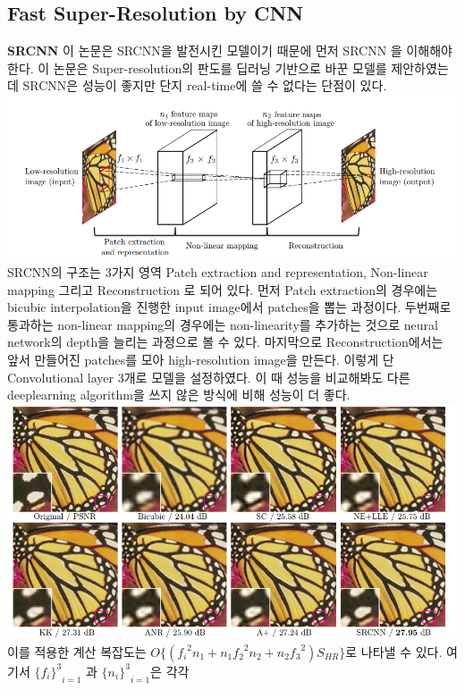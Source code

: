 \documentclass[extendedabs]{bmvc2k}
\begin{document}
 \subsection{Fast Super-Resolution by CNN}
 \quad \textbf{SRCNN} 이 논문은 SRCNN을 발전시킨 모델이기 때문에 먼저 SRCNN \cite{dong2015image} 을 이해해야 한다. 이 논문은 Super-resolution의
 판도를 딥러닝 기반으로 바꾼 모델를 제안하였는데 SRCNN은 성능이 좋지만 단지 real-time에 쓸 수 없다는 단점이 있다.
 \newline  \includegraphics[width=\linewidth]{images/00_SR.PNG}
 SRCNN의 구조는 3가지 영역 Patch extraction and representation, Non-linear mapping 그리고 Reconstruction 로 되어 있다.
 먼저 Patch extraction의 경우에는 bicubic interpolation을 진행한 input image에서 patches을 뽑는 과정이다.
 두번째로 통과하는 non-linear mapping의 경우에는 non-linearity를 추가하는 것으로 neural network의 depth을 늘리는 과정으로 볼 수 있다.
 마지막으로 Reconstruction에서는 앞서 만들어진 patches를 모아 high-resolution image을 만든다. 
 이렇게 단 Convolutional layer 3개로 모델을 설정하였다. 이 때 성능을 비교해봐도 다른 deeplearning algorithm을 쓰지
 않은 방식에 비해 성능이 더 좋다. 
 \newline  \includegraphics[width=\linewidth]{images/01_SR.PNG}
 이를 적용한 계산 복잡도는 $O\{({f_i}^2n_1+n_1{f_2}^2n_2+n_2{f_3}^2)S_{HR}\}$로 나타낼 수 있다. 여기서  ${{\{f_i\}}^3}_{i=1}$ 과 ${{\{n_i\}}^3}_{i=1}$은 각각
\end{document}
